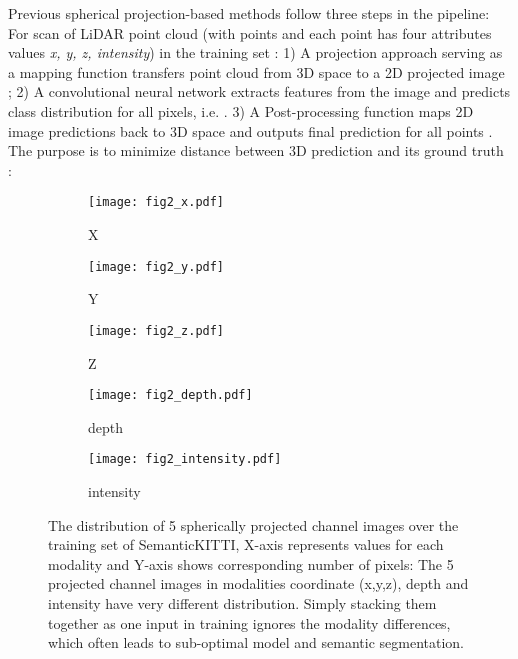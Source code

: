 \documentclass[preprint,review,3p]{elsarticle}
\begin{document}
Previous spherical projection-based methods follow three steps in the pipeline: For  scan of LiDAR point cloud  (with  points and each point has four attributes values \textit{x, y, z, intensity}) in the training set : 1) A projection approach serving as a mapping function  transfers point cloud from 3D space to a 2D projected image ; 2) A convolutional neural network  extracts features from the image and predicts class distribution for all pixels,  i.e. . 3) A Post-processing function  maps 2D image predictions back to 3D space and outputs final prediction for all points . The purpose is to minimize distance  between 3D prediction  and its ground truth :



\begin{figure}
  \begin{subfigure}[b]{0.3\textwidth}
  \texttt{[image: fig2\_x.pdf]}
  \caption{X}
  \end{subfigure}
  \begin{subfigure}[b]{0.3\textwidth}
  \texttt{[image: fig2\_y.pdf]}
  \caption{Y}
  \end{subfigure}
  \begin{subfigure}[b]{0.3\textwidth}
  \texttt{[image: fig2\_z.pdf]}
  \caption{Z}
  \end{subfigure}
  
  \begin{subfigure}[b]{0.3\textwidth}
  \texttt{[image: fig2\_depth.pdf]}
  \caption{depth}
  \end{subfigure}
  \begin{subfigure}[b]{0.3\textwidth}
  \texttt{[image: fig2\_intensity.pdf]}
  \caption{intensity}
  \end{subfigure}

  \caption{The distribution of 5 spherically projected channel images over the training set of SemanticKITTI, X-axis represents values for each modality and Y-axis shows corresponding number of pixels: The 5 projected channel images in modalities coordinate (x,y,z), depth and intensity have very different distribution. Simply stacking them together as one input in training ignores the modality differences, which often leads to sub-optimal model and semantic segmentation.}\label{fig.DistVary}
\end{figure}
\end{document}
